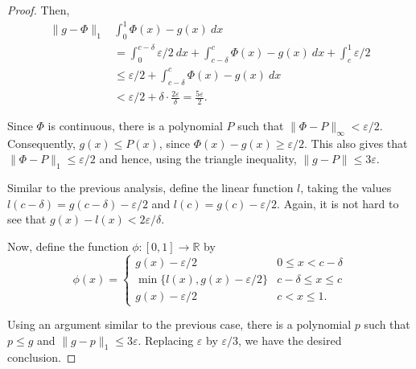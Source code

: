 \documentclass[12pt]{amsart}
\newcommand{\R}{\mathbb{R}}
\begin{document}
\begin{enumerate}[label=(\alph*)]
\begin{proof}
	Then, 
	\begin{align*}
		\|g - \Phi\|_1 & \int_0^1 \Phi(x) - g(x)~dx\\
		&= \int_0^{c - \delta}\varepsilon/2~dx + \int_{c - \delta}^c \Phi(x) - g(x)~dx + \int_c^1 \varepsilon/2\\
		&\le\varepsilon/2 + \int_{c - \delta}^c \Phi(x) - g(x)~dx\\
		&<\varepsilon/2 + \delta\cdot\frac{2\varepsilon}{\delta} = \frac{5\varepsilon}{2}.
	\end{align*}

	Since $\Phi$ is continuous, there is a polynomial $P$ such that $\|\Phi - P\|_\infty < \varepsilon/2$. Consequently, $g(x)\le P(x)$, since $\Phi(x) - g(x)\ge \varepsilon/2$. This also gives that $\|\Phi - P\|_1\le\varepsilon/2$ and hence, using the triangle inequality, $\|g - P\|\le 3\varepsilon$.


	Similar to the previous analysis, define the linear function $l$, taking the values $l(c - \delta) = g(c - \delta) - \varepsilon/2$ and $l(c) = g(c) - \varepsilon/2$. Again, it is not hard to see that $g(x) - l(x) < 2\varepsilon/\delta$.

	Now, define the function $\phi: [0,1]\to\R$ by 
	\begin{equation*}
		\phi(x) =
		\begin{cases}
			g(x) - \varepsilon/2 & 0\le x < c - \delta\\
			\min\{l(x), g(x) - \varepsilon/2\} & c - \delta\le x\le c\\
			g(x) - \varepsilon/2 & c < x\le 1.
		\end{cases}
	\end{equation*}

	Using an argument similar to the previous case, there is a polynomial $p$ such that $p\le g$ and $\|g - p\|_1\le 3\varepsilon$. Replacing $\varepsilon$ by $\varepsilon/3$, we have the desired conclusion.
\end{proof}



\end{enumerate}
\end{document}
